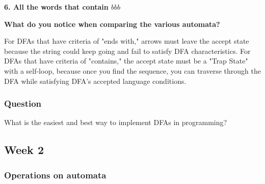 \documentclass{article}
\theoremstyle{theorem}
\theoremstyle{definition}
\theoremstyle{remark}
\begin{document}
\vspace{0.5cm}
\textbf{6. All the words that contain $bbb$}

\begin{center}
\end{center}

\textbf{What do you notice when comparing the various automata?}

For DFAs that have criteria of "ends with," arrows must leave the accept state because the string could keep going and fail to satisfy DFA characteristics. For DFAs that have criteria of "contains," the accept state must be a "Trap State" with a self-loop, because once you find the sequence, you can traverse through the DFA while satisfying DFA's accepted language conditions.

\subsubsection{Question}
What is the easiest and best way to implement DFAs in programming?

\subsection{Week 2}

\subsubsection{Operations on automata}
\end{document}
